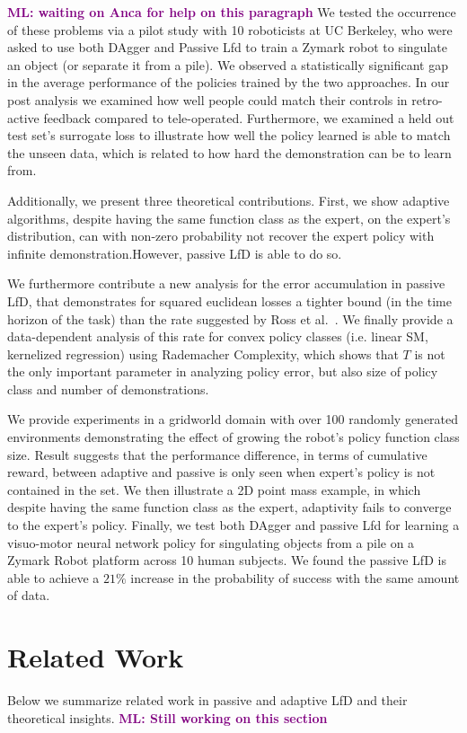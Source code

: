 \documentclass[10pt, conference]{ieeeconf}      %
\newcommand{\mlnote}[1]{\ifthenelse{ \boolean{include-notes}}%
 {\textcolor{purple}{\textbf{ML: #1}}}{}}
\begin{document}
\mlnote{waiting on Anca for help on this paragraph}
 We tested the occurrence of  these problems via a pilot study with 10 roboticists at UC Berkeley, who were asked to use both DAgger and Passive Lfd to train a Zymark robot to singulate an object (or separate it from a pile). We observed a statistically significant gap in the average performance of the policies trained by the two approaches. In our  post analysis we examined how well people could match their controls in retro-active feedback compared to tele-operated. Furthermore, we examined a held out test set's surrogate loss to illustrate how well the policy learned is able to match the unseen data, which is related to how hard the demonstration can be to learn from. 


Additionally, we present three theoretical contributions. First, we show adaptive algorithms, despite having the same function class as the expert, on the expert's distribution, can with non-zero probability not recover the expert policy with infinite demonstration.However, passive LfD is able to do so. 


We furthermore contribute a new analysis for the error accumulation in passive LfD, that demonstrates for squared euclidean losses a tighter bound (in the time horizon of the task) than the rate suggested by Ross et al.~\cite{ross2010efficient}. We finally provide a data-dependent analysis of this rate for convex policy classes (i.e. linear SM, kernelized regression) using Rademacher Complexity, which shows that $T$ is not the only important parameter in analyzing policy error, but also size of policy class and number of demonstrations.

We  provide experiments in a gridworld domain with over 100 randomly generated environments demonstrating the effect of growing the robot's policy function class size. Result suggests that the performance difference, in terms of cumulative reward, between adaptive and passive is only seen when expert's policy is not contained in the set. We then illustrate a 2D point mass example, in which despite having the same function class as the expert, adaptivity fails to converge to the expert's policy. Finally, we test both DAgger and passive Lfd for learning a visuo-motor neural network policy for singulating objects from a pile on a Zymark Robot platform across 10 human subjects. We found the passive LfD is able to achieve a $21 \%$ increase in the probability of success with the same amount of data.




\section{Related Work}
Below we summarize related work in passive and adaptive LfD and their theoretical insights. \mlnote{Still working on this section}
\end{document}

